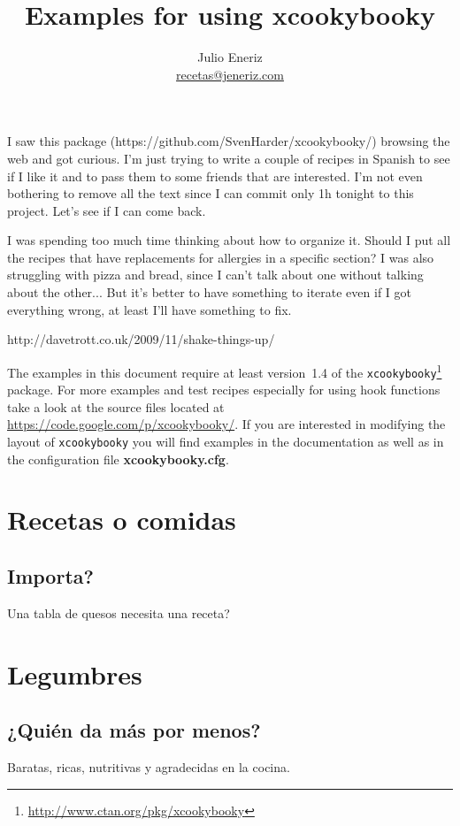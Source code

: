 \documentclass[%
a4paper,
twoside,
14pt
]{book}
\begin{document}
\title{Examples for using \textbf{xcookybooky}}
\author{Julio Eneriz\\ \href{mailto:recetas@jeneriz.com}{recetas@jeneriz.com}}
\maketitle

\noindent I saw this package (https://github.com/SvenHarder/xcookybooky/) browsing the web and got curious. I'm just trying to write a couple of recipes in Spanish to see if I like it and to pass them to some friends that are interested. I'm not even bothering to remove all the text since I can commit only 1h tonight to this project. Let's see if I can come back.

\noindent I was spending too much time thinking about how to organize it. Should I put all the recipes that have replacements for allergies in a specific section? I was also struggling with pizza and bread, since I can't talk about one without talking about the other... But it's better to have something to iterate even if I got everything wrong, at least I'll have something to fix.

http://davetrott.co.uk/2009/11/shake-things-up/

    \noindent The examples in this document require at least version~1.4 of the \texttt{xcookybooky}\footnote{\url{http://www.ctan.org/pkg/xcookybooky}} package. For more examples and test recipes especially for using hook functions take a look at the source files located at \url{https://code.google.com/p/xcookybooky/}. If you are interested in modifying the layout of \texttt{xcookybooky} you will find examples in the documentation as well as in the configuration file \textbf{xcookybooky.cfg}.

\tableofcontents

\vspace{5em}
\chapter{Recetas o comidas}
\section{Importa?}
Una tabla de quesos necesita una receta? 

\chapter{Legumbres}
\section{¿Quién da más por menos?}
Baratas, ricas, nutritivas y agradecidas en la cocina.
\end{document}
